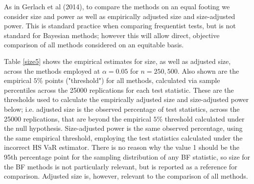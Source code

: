 \documentclass[12pt,epsf]{article}
\begin{document}
As in Gerlach et al (2014), to compare the methods on an equal footing we consider size and power as well as empirically adjusted
size and size-adjusted power. This is standard practice when comparing frequentist tests, but is not standard for Bayesian
methods; however this will allow direct, objective comparison of all methods considered on an equitable basis.

Table \ref{size5} shows the empirical estimates for size, as well as adjusted size, across the methods employed at
$\alpha=0.05$ for $n=250,500$. Also shown are the empirical $5\%$ points ("threshold") for all methods, calculated via
sample percentiles across the 25000 replications for each test statistic. These are the thresholds used to calculate the
empirically adjusted size and size-adjusted power below; i.e. adjusted size is the observed percentage
of test statistics, across the 25000 replications, that are beyond the empirical $5\%$ threshold calculated under the null hypothesis.
Size-adjusted power is the same observed percentage, using the same empirical threshold, employing the test statistics calculated under the
incorrect HS VaR estimator. There is no reason why the value 1 should be the 95th percentage point for the sampling distribution of any
BF statistic, so size for the BF methods is not particularly relevant, but is reported as a reference for comparison.
Adjusted size is, however, relevant to the comparison of all methods.
\end{document}
